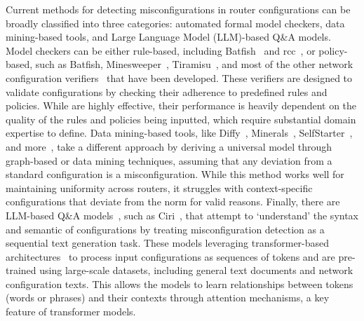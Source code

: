 Current methods for detecting misconfigurations in router configurations can be broadly classified into three categories: automated formal model checkers, data mining-based tools, and Large Language Model (LLM)-based Q\&A models. Model checkers can be either rule-based, including Batfish~\cite{fogel2015general} and rcc~\cite{feamster2005detecting}, or policy-based, such as Batfish, Minesweeper~\cite{beckett2017general}, Tiramisu~\cite{abhashkumar2020tiramisu}, and most of the other network configuration verifiers~\cite{kakarla2020finding,prabhu2020plankton, al2009network, ritchey2000using,al2011configchecker, jeffrey2009model} that have been developed. These verifiers are designed to validate configurations by checking their adherence to predefined rules and policies. While are highly effective, their performance is heavily dependent on the quality of the rules and policies being inputted, which require substantial domain expertise to define. Data mining-based tools, like Diffy~\cite{kakarla2024diffy}, Minerals~\cite{le2006minerals}, SelfStarter~\cite{kakarla2020finding}, and more~\cite{le2008detecting,le2006characterization}, take a different approach by deriving a universal model through graph-based or data mining techniques, assuming that any deviation from a standard configuration is a misconfiguration. While this method works well for maintaining uniformity across routers, it struggles with context-specific configurations that deviate from the norm for valid reasons. Finally, there are LLM-based Q\&A models~\cite{bogdanov2024leveraging,chen2024automatic,wang2024identifying,liu2024large, wang2024netconfeval}, such as Ciri~\cite{lian2023configuration}, that attempt to `understand' the syntax and semantic of configurations by treating misconfiguration detection as a sequential text generation task. These models leveraging transformer-based architectures~\cite{vaswani2017attention} to process input configurations as sequences of tokens and are pre-trained using large-scale datasets, including general text documents and network configuration texts. This allows the models to learn relationships between tokens (words or phrases) and their contexts through attention mechanisms, a key feature of transformer models.


